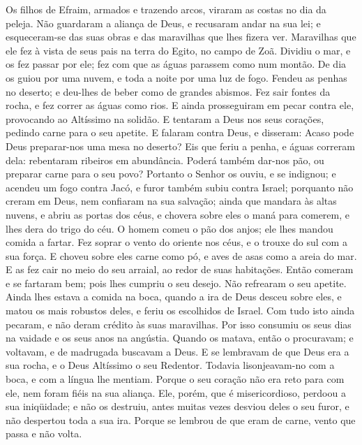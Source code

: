 Os filhos de Efraim, armados e trazendo arcos, viraram as costas
no dia da peleja. Não guardaram a aliança de Deus, e
recusaram andar na sua lei; e esqueceram-se das suas obras e
das maravilhas que lhes fizera ver. Maravilhas que ele fez à
vista de seus pais na terra do Egito, no campo de Zoã.
Dividiu o mar, e os fez passar por ele; fez com que as águas
parassem como num montão. De dia os guiou por uma nuvem, e
toda a noite por uma luz de fogo. Fendeu as penhas no
deserto; e deu-lhes de beber como de grandes abismos. Fez
sair fontes da rocha, e fez correr as águas como rios. E
ainda prosseguiram em pecar contra ele, provocando ao Altíssimo na
solidão. E tentaram a Deus nos seus corações, pedindo carne
para o seu apetite. E falaram contra Deus, e disseram: Acaso
pode Deus preparar-nos uma mesa no deserto? Eis que feriu a
penha, e águas correram dela: rebentaram ribeiros em abundância.
Poderá também dar-nos pão, ou preparar carne para o seu povo?
Portanto o Senhor os ouviu, e se indignou; e acendeu um fogo
contra Jacó, e furor também subiu contra Israel; porquanto
não creram em Deus, nem confiaram na sua salvação; ainda que
mandara às altas nuvens, e abriu as portas dos céus, e
chovera sobre eles o maná para comerem, e lhes dera do trigo do céu.
O homem comeu o pão dos anjos; ele lhes mandou comida a
fartar. Fez soprar o vento do oriente nos céus, e o trouxe do
sul com a sua força. E choveu sobre eles carne como pó, e
aves de asas como a areia do mar. E as fez cair no meio do
seu arraial, ao redor de suas habitações. Então comeram e se
fartaram bem; pois lhes cumpriu o seu desejo. Não refrearam o
seu apetite. Ainda lhes estava a comida na boca, quando a ira
de Deus desceu sobre eles, e matou os mais robustos deles, e feriu
os escolhidos de Israel. Com tudo isto ainda pecaram, e não
deram crédito às suas maravilhas. Por isso consumiu os seus
dias na vaidade e os seus anos na angústia. Quando os matava,
então o procuravam; e voltavam, e de madrugada buscavam a Deus.
E se lembravam de que Deus era a sua rocha, e o Deus
Altíssimo o seu Redentor. Todavia lisonjeavam-no com a boca,
e com a língua lhe mentiam. Porque o seu coração não era reto
para com ele, nem foram fiéis na sua aliança. Ele, porém, que
é misericordioso, perdoou a sua iniqüidade; e não os destruiu, antes
muitas vezes desviou deles o seu furor, e não despertou toda a sua
ira. Porque se lembrou de que eram de carne, vento que passa
e não volta.

